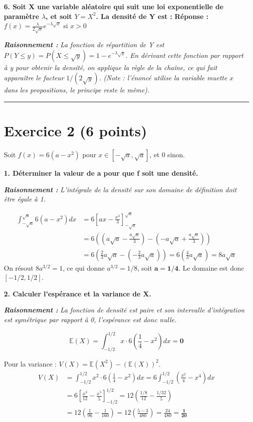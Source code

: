 \documentclass[11pt,a4paper]{article}
\newcommand{\raisonnement}[1]{
    \vspace{0.2cm}
    \noindent\textcolor{blue!80!black}{
        \textbf{\textit{Raisonnement : }} \textit{#1}
    }
    \vspace{0.2cm}
}
\begin{document}
\textbf{6. Soit X une variable aléatoire qui suit une loi exponentielle de paramètre $\lambda$, et soit $Y=X^2$. La densité de Y est :}
\textbf{Réponse :} $f(x) = \frac{\lambda}{2\sqrt{x}} e^{-\lambda\sqrt{x}}$ si $x>0$
\raisonnement{La fonction de répartition de Y est $P(Y \le y) = P(X \le \sqrt{y}) = 1 - e^{-\lambda\sqrt{y}}$. En dérivant cette fonction par rapport à y pour obtenir la densité, on applique la règle de la chaîne, ce qui fait apparaître le facteur $1/(2\sqrt{y})$. (Note : l'énoncé utilise la variable muette $x$ dans les propositions, le principe reste le même).}

\vspace{0.5cm}
\hrule
\vspace{0.5cm}

\section*{Exercice 2 (6 points)}

Soit $f(x) = 6(a-x^2)$ pour $x \in [-\sqrt{a}, \sqrt{a}]$, et 0 sinon.

\textbf{1. Déterminer la valeur de a pour que f soit une densité.}
\raisonnement{L'intégrale de la densité sur son domaine de définition doit être égale à 1.}
\begin{align*}
\int_{-\sqrt{a}}^{\sqrt{a}} 6(a-x^2) dx &= 6 \left[ ax - \frac{x^3}{3} \right]_{-\sqrt{a}}^{\sqrt{a}} \\
&= 6 \left( \left(a\sqrt{a} - \frac{a\sqrt{a}}{3}\right) - \left(-a\sqrt{a} + \frac{a\sqrt{a}}{3}\right) \right) \\
&= 6 \left( \frac{2}{3}a\sqrt{a} - \left(-\frac{2}{3}a\sqrt{a}\right) \right) = 6 \left( \frac{4}{3}a\sqrt{a} \right) = 8a\sqrt{a}
\end{align*}
On résout $8a^{3/2} = 1$, ce qui donne $a^{3/2} = 1/8$, soit $\mathbf{a = 1/4}$.
Le domaine est donc $[-1/2, 1/2]$.

\textbf{2. Calculer l'espérance et la variance de X.}
\raisonnement{La fonction de densité est paire et son intervalle d'intégration est symétrique par rapport à 0, l'espérance est donc nulle.}
$$ \mathbb{E}(X) = \int_{-1/2}^{1/2} x \cdot 6\left(\frac{1}{4}-x^2\right) dx = \mathbf{0} $$

Pour la variance : $V(X) = \mathbb{E}(X^2) - (\mathbb{E}(X))^2$.
\begin{align*}
V(X) &= \int_{-1/2}^{1/2} x^2 \cdot 6\left(\frac{1}{4}-x^2\right) dx = 6 \int_{-1/2}^{1/2} \left(\frac{x^2}{4} - x^4\right) dx \\
&= 6 \left[ \frac{x^3}{12} - \frac{x^5}{5} \right]_{-1/2}^{1/2} = 12 \left( \frac{1/8}{12} - \frac{1/32}{5} \right) \\
&= 12 \left( \frac{1}{96} - \frac{1}{160} \right) = 12 \left( \frac{5 - 3}{480} \right) = \frac{24}{480} = \mathbf{\frac{1}{20}}
\end{align*}
\end{document}
